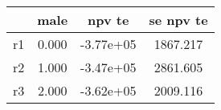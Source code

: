 \begin{table}[htbp]
\begin{tabular}{lccc} \hline \hline
 & male  & npv te  & se npv te  \\  \hline 
r1 &     0.000 & -3.77e+05 &  1867.217 \\  
r2 &     1.000 & -3.47e+05 &  2861.605 \\  
r3 &     2.000 & -3.62e+05 &  2009.116 \\  
\hline \hline \end{tabular}
\end{table}
